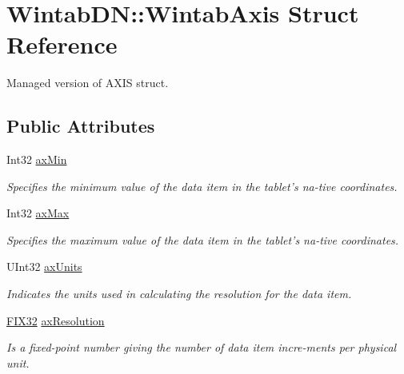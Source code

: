 \hypertarget{struct_wintab_d_n_1_1_wintab_axis}{
\section{WintabDN::WintabAxis Struct Reference}
\label{struct_wintab_d_n_1_1_wintab_axis}
}


Managed version of AXIS struct.  


\subsection*{Public Attributes}
\begin{DoxyCompactItemize}
\item 
Int32 \hyperlink{struct_wintab_d_n_1_1_wintab_axis_a03fc660c302fa514b40c5e74a6a4e277}{axMin}
\begin{DoxyCompactList}\small\item\em Specifies the minimum value of the data item in the tablet's na-\/tive coordinates. \item\end{DoxyCompactList}\item 
Int32 \hyperlink{struct_wintab_d_n_1_1_wintab_axis_a0f449ce8591349ff40a0aeda1acb406f}{axMax}
\begin{DoxyCompactList}\small\item\em Specifies the maximum value of the data item in the tablet's na-\/tive coordinates. \item\end{DoxyCompactList}\item 
UInt32 \hyperlink{struct_wintab_d_n_1_1_wintab_axis_a778377ddf52f8dc0aa483e6f942aeebc}{axUnits}
\begin{DoxyCompactList}\small\item\em Indicates the units used in calculating the resolution for the data item. \item\end{DoxyCompactList}\item 
\hyperlink{class_wintab_d_n_1_1_f_i_x32}{FIX32} \hyperlink{struct_wintab_d_n_1_1_wintab_axis_ae70c658765a04de55fe6f219cbd832f8}{axResolution}
\begin{DoxyCompactList}\small\item\em Is a fixed-\/point number giving the number of data item incre-\/ments per physical unit. \item\end{DoxyCompactList}\end{DoxyCompactItemize}


